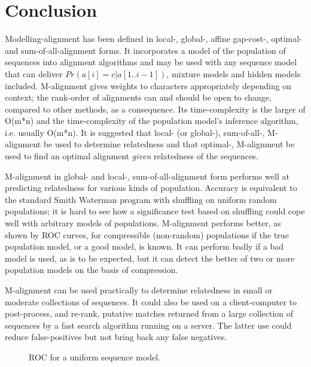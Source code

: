 \documentclass[a4paper,11pt,oneside]{article}
\def\plotwidth{0.7\columnwidth}
\begin{document}
\section{Conclusion}
\label{sec:conc}


Modelling-alignment has been defined in local-, global-, affine gap-cost-,
optimal- and sum-of-all-alignment forms.  It incorporates a model of the
population of sequences into alignment algorithms and may be used with any
sequence model that can deliver $Pr(a[i]=c|a[1..i-1])$, mixture models and
hidden models included.  M-alignment gives weights to characters appropriately
depending on context; the rank-order of alignments can and should be open to
change, compared to other methods, as a consequence.  Its time-complexity is
the larger of O(m*n) and the time-complexity of the population model's
inference algorithm, i.e. usually O(m*n).  It is suggested that local- (or
global-), sum-of-all-, M-alignment be used to determine relatedness and that
optimal-, M-alignment be used to find an optimal alignment {\em given}
relatedness of the sequences.

M-alignment in global- and local-, sum-of-all-alignment form performs well
at predicting relatedness for various kinds of population.
Accuracy is equivalent to the standard Smith Waterman program with shuffling
on uniform random populations;
it is hard to see how a significance test based on shuffling could
cope well with arbitrary models of populations.
M-alignment performs better, as shown by ROC curves,
for compressible (non-random) populations if the true
population model, or a good model, is known.
It can perform badly if a bad model is used, as is to be expected,
but it can detect the better of two or more population models
on the basis of compression.

M-alignment can be used practically to determine relatedness
in small or moderate collections of sequences.
It could also be used on a client-computer to post-process, and re-rank,
putative matches returned from a large collection of sequences
by a fast search algorithm running on a server.
The latter use could reduce false-positives but not bring back
any false negatives.



\clearpage

\begin{figure}
\centering
\epsfig{file=roc_uni.eps, width=\plotwidth}
\caption{\label{fig:roc_uni}ROC for a uniform sequence model.}
\end{figure}
\end{document}
